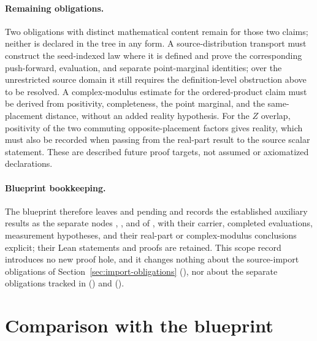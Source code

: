 \documentclass[11pt]{article}
\begin{document}
\paragraph{Remaining obligations.}
Two obligations with distinct mathematical content remain for those two
claims; neither is declared in the tree in any form.  A source-distribution
transport must construct the seed-indexed law where it is defined and prove
the corresponding push-forward, evaluation, and separate point-marginal
identities; over the unrestricted source domain it still requires the
definition-level obstruction above to be resolved.  A complex-modulus
estimate for the ordered-product claim must be derived from positivity,
completeness, the point marginal, and the same-placement distance, without
an added reality hypothesis.  For the $Z$ overlap, positivity of the two
commuting opposite-placement factors gives reality, which must also be
recorded when passing from the real-part result to the source scalar
statement.  These are described future proof targets, not assumed or
axiomatized declarations.

\paragraph{Blueprint bookkeeping.}
The blueprint therefore leaves  and
 pending and records the established auxiliary results
as the separate nodes ,
,  and
 of
, with their carrier,
completed evaluations, measurement hypotheses, and their real-part or
complex-modulus conclusions explicit; their Lean statements and proofs are retained.  This scope record
introduces no new proof hole, and it changes nothing about the source-import
obligations of Section~\ref{sec:import-obligations} (), nor
about the separate obligations tracked in
 ()
and 
().

\section{Comparison with the blueprint}
\end{document}

